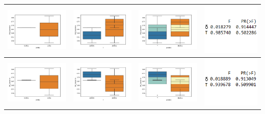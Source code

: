 \begin{table}[h]
\begin{tabular}[c]{llll}
\multicolumn{1}{|l|}{\includegraphics[align=t, width=33mm]{cajasDeltha_exp22.jpg}}    & \multicolumn{1}{l|}{\includegraphics[align=t, width=33mm]{cajasT1_exp22.jpg} } & \multicolumn{1}{l|}{\includegraphics[align=t, width=33mm]{cajasT_Deltha_exp22.jpg} } & \multicolumn{1}{p{3cm}|}{\includegraphics[align=t, width=30mm]{Anova22.png}} \\ \hline
\multicolumn{1}{|l|}{\includegraphics[align=t, width=33mm]{cajasDeltha_exp23.jpg}}    & \multicolumn{1}{l|}{\includegraphics[align=t, width=33mm]{cajasT1_exp23.jpg} } & \multicolumn{1}{l|}{\includegraphics[align=t, width=33mm]{cajasT_Deltha_exp23.jpg} } & \multicolumn{1}{p{3cm}|}{\includegraphics[align=t, width=30mm]{Anova23.png}} \\ \hline
\end{tabular}
\label{exp2}
\end{table}

